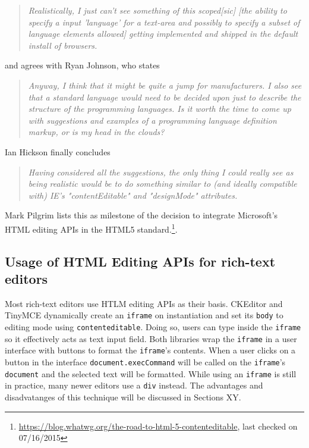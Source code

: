 \begin{quotation}
\textit{Realistically, I just can't see something of this scoped[sic] [the ability to specify a input 'language' for a text-area and possibly to specify a subset of language elements allowed] getting implemented and shipped in the default install of browsers.}
\end{quotation}

and agrees with Ryan Johnson, who states

\begin{quotation}
\textit{Anyway, I think that it might be quite a jump for manufacturers. I also see that a standard language would need to be decided upon just to describe the structure of the programming languages. Is it worth the time to come up with suggestions and examples of a programming language definition markup, or is my head in the clouds?}
\end{quotation}

Ian Hickson finally concludes

\begin{quotation}
\textit{Having considered all the suggestions, the only thing I could really see 
as being realistic would be to do something similar to (and ideally 
compatible with) IE's "contentEditable" and "designMode" attributes.}
\end{quotation}

Mark Pilgrim lists this as milestone of the decision to integrate Microsoft's HTML editing APIs in the HTML5 standard.\footnote{\url{https://blog.whatwg.org/the-road-to-html-5-contenteditable}, last checked on 07/16/2015}.


\subsection{Usage of HTML Editing APIs for rich-text editors}
\label{sec:useage-of-html-editing-apis}

Most rich-text editors use HTLM editing APIs as their basis. CKEditor and TinyMCE dynamically create an \texttt{iframe} on instantiation and set its \texttt{body} to editing mode using \texttt{contenteditable}. Doing so, users can type inside the \texttt{iframe} so it effectively acts as text input field. Both libraries wrap the \texttt{iframe} in a user interface with buttons to format the \texttt{iframe}'s contents. When a user clicks on a button in the interface \texttt{document.execCommand} will be called on the \texttt{iframe}'s \texttt{document} and the selected text will be formatted. While using an \texttt{iframe} is still in practice, many newer editors use a  \texttt{div} instead. The advantages and disadvatanges of this technique will be discussed in Sections XY.


